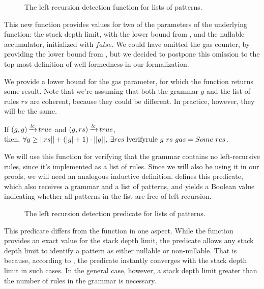\begin{figure}
    \centering
    
    \caption{The left recursion detection function for lists of patterns.}
    \label{fig:lverifyrule-function}
\end{figure}

This new function provides values
for two of the parameters of the underlying function:
the stack depth limit, with the lower bound from ,
and the nullable accumulator, initialized with $false$.
We could have omitted the gas counter,
by providing the lower bound from ,
but we decided to postpone
this omission to the top-most definition
of well-formedness in our formalization.

We provide a lower bound for the gas parameter,
for which the function returns some result.
Note that we're assuming that both the grammar $g$
and the list of rules $rs$ are coherent,
because they could be different.
In practice, however,
they will be the same.

\begin{lemma}%
    If $(g,g) \operatorname{\xrightarrow{\mathit{lc}}} true$ and $(g,rs) \operatorname{\xrightarrow{\mathit{lc}}} true$, \\
    then, $\forall g \ge ||rs|| + (|g| + 1) \cdot ||g||$,
    $\exists res\ \lverifyrulecomp{g}{rs}{gas} = \Some res$.
\end{lemma}

We will use this function for
verifying that the grammar contains
no left-recursive rules,
since it's implemented as a list of rules.
Since we will also be using it in our proofs,
we will need an analogous inductive definition.
 defines this predicate,
which also receives a grammar and a list of patterns,
and yields a Boolean value indicating
whether all patterns in the list are free of left recursion.

\begin{figure}
    \centering
    
    \caption{The left recursion detection predicate for lists of patterns.}
    \label{fig:lverifyrule}
\end{figure}

This predicate differs from the function in one aspect.
While the function provides an exact value for the
stack depth limit, the predicate allows any stack depth limit
to identify a pattern as either nullable or non-nullable.
That is because, according to ,
the predicate instantly converges with the stack depth limit in such cases.
In the general case, however,
a stack depth limit greater than
the number of rules in the grammar
is necessary.

